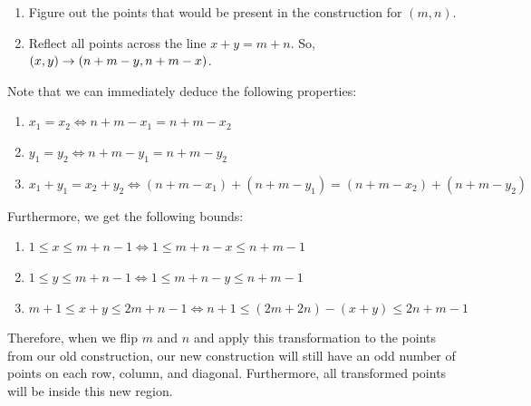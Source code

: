 \documentclass[10pt]{../usamts}
\begin{document}
\begin{solution}
\begin{enumerate}
    \item Figure out the points that would be present in the construction for $(m,n)$.
    \item Reflect all points across the line $x+y=m+n$. So, $(x,y) \rightarrow \left( n+m - y, n+m - x \right)$.
\end{enumerate}

Note that we can immediately deduce the following properties:

\begin{enumerate}
    \item $x_1 = x_2 \iff n+m-x_1 = n+m-x_2$
    \item $y_1 = y_2 \iff n+m-y_1 = n+m-y_2$
    \item $x_1 + y_1 = x_2 + y_2 \iff (n+m-x_1) + (n+m-y_1) = (n+m-x_2) + (n+m-y_2)$
\end{enumerate}

Furthermore, we get the following bounds:

\begin{enumerate}
    \item $1 \le x \le m+n-1 \iff 1 \le m+n-x \le n+m-1$
    \item $1 \le y \le m+n-1 \iff 1 \le m+n-y \le n+m-1$
    \item $m+1 \le x+y \le 2m+n-1 \iff n+1 \le (2m+2n) - (x+y) \le 2n+m-1$
\end{enumerate}

Therefore, when we flip $m$ and $n$ and apply this transformation to the points from our old construction, our new construction will still have an odd number of points on each row, column, and diagonal. Furthermore, all transformed points will be inside this new region.

\clearpage

\end{solution}
\end{document}
